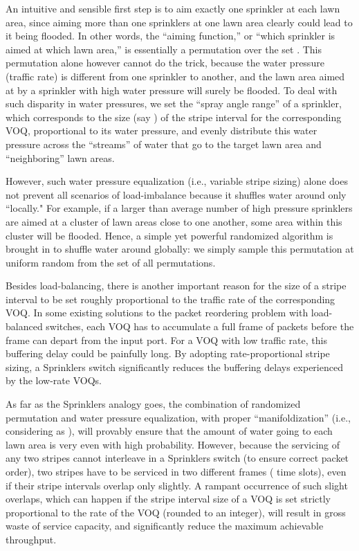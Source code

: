 An intuitive and sensible first step is to aim exactly one sprinkler at each lawn area,
since aiming more than one sprinklers at one lawn area
clearly could lead to it being flooded.
In other words, the ``aiming function,'' or ``which sprinkler is aimed at which lawn area,'' 
is essentially a permutation over the set .
This permutation alone however cannot do the trick, because the water pressure (traffic rate) is 
different from one sprinkler to another, and the lawn area aimed at by a sprinkler with high water 
pressure will surely be flooded.
To deal with such disparity in water pressures, we 
set the ``spray angle range'' of a sprinkler, which corresponds to the size (say ) of the stripe interval for the
corresponding VOQ, proportional to its water pressure, and evenly distribute this water pressure 
across the 
 ``streams'' of water that go to the target lawn area and  ``neighboring'' lawn areas.


However, such water pressure equalization (i.e., variable stripe sizing) alone does not prevent all scenarios of load-imbalance 
because it shuffles water around only ``locally."
For example, if a larger than average 
number of high pressure sprinklers are aimed at a cluster of lawn areas close to one another, some area within 
this cluster will be flooded.   Hence, 
a simple yet powerful randomized algorithm is brought in 
to shuffle water around globally: we simply sample this permutation 
at uniform random
from the set of all  permutations.





Besides load-balancing, there is another important reason for the size of a stripe interval to be set roughly 
proportional to the traffic rate of the corresponding VOQ.  In 
some existing solutions to the packet reordering
problem with load-balanced switches, each VOQ has to accumulate a full frame of  packets before the frame can depart from the 
input port.  For a VOQ with low traffic rate, this buffering delay could be painfully long.  By adopting
rate-proportional
stripe sizing, a Sprinklers switch significantly reduces the buffering delays experienced by the low-rate VOQs.

As far as the Sprinklers analogy goes, the combination of randomized permutation and water pressure equalization,
with proper ``manifoldization'' (i.e., considering  as ),
will provably ensure that the amount of water going to each lawn area is very even with high 
probability.   However, because the servicing of any two stripes cannot interleave in a Sprinklers switch (to ensure correct
packet order), two stripes have to be serviced in two different frames ( time slots),
even if their stripe intervals overlap only slightly.  
A rampant occurrence of such slight overlaps, which can happen if the stripe interval size of a VOQ is set strictly proportional
to the rate of the VOQ (rounded to an integer), 
will result in gross waste of service capacity, and significantly reduce the maximum achievable throughput.


